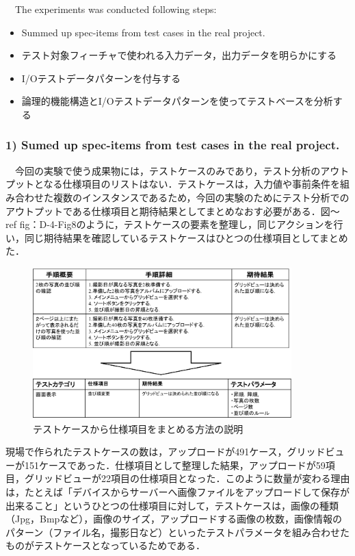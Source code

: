 \documentclass[a4paper,12pt]{jreport}
\begin{document}
　The experiments was conducted following steps:


\begin{itemize}
\item Summed up spec-items from test cases in the real project.
\item テスト対象フィーチャで使われる入力データ，出力データを明らかにする
\item I/Oテストデータパターンを付与する
\item 論理的機能構造とI/Oテストデータパターンを使ってテストベースを分析する
\end{itemize}

\subsubsection{1) Sumed up spec-items from test cases in the real project.}
　今回の実験で使う成果物には，テストケースのみであり，テスト分析のアウトプットとなる仕様項目のリストはない．テストケースは，入力値や事前条件を組み合わせた複数のインスタンスであるため，今回の実験のためにテスト分析でのアウトプットである仕様項目と期待結果としてまとめなおす必要がある．図〜ref {fig：D-4-Fig8}のように，テストケースの要素を整理し，同じアクションを行い，同じ期待結果を確認しているテストケースはひとつの仕様項目としてまとめた．

   \begin{figure}[htbp]
  \begin{center}
  \includegraphics[width=10cm]{./image/D-4-Fig8.png}
  \caption{テストケースから仕様項目をまとめる方法の説明}
  \label{fig:D-4-Fig8}
  \end{center}
   \end{figure}

現場で作られたテストケースの数は，アップロードが491ケース，グリッドビューが151ケースであった．仕様項目として整理した結果，アップロードが59項目，グリッドビューが22項目の仕様項目となった．このように数量が変わる理由は，たとえば「デバイスからサーバーへ画像ファイルをアップロードして保存が出来ること」というひとつの仕様項目に対して，テストケースは，画像の種類（Jpg，Bmpなど），画像のサイズ，アップロードする画像の枚数，画像情報のパターン（ファイル名，撮影日など）といったテストパラメータを組み合わせたものがテストケースとなっているためである．
\end{document}
